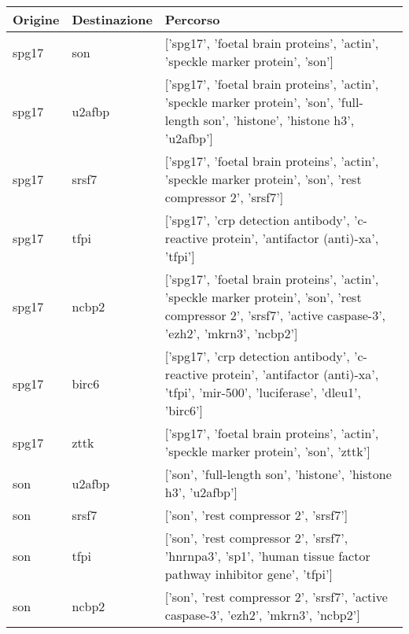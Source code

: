 \documentclass[12pt]{report}
\begin{document}
\begin{table}[!htb]
    \begin{tabularx}{\textwidth}{|l|l|X|}
            \hline
            \textbf{Origine} & \textbf{Destinazione} & \textbf{Percorso}  \\
            \hline
            \scriptsize{spg17} & \scriptsize{son} & \scriptsize{ ['spg17', 'foetal brain proteins', 'actin', 'speckle marker protein', 'son'] } \\ \hline
        \scriptsize{spg17} & \scriptsize{u2afbp} & \scriptsize{ ['spg17', 'foetal brain proteins', 'actin', 'speckle marker protein', 'son', 'full-length son', 'histone', 'histone h3', 'u2afbp'] } \\ \hline
        \scriptsize{spg17} & \scriptsize{srsf7} & \scriptsize{ ['spg17', 'foetal brain proteins', 'actin', 'speckle marker protein', 'son', 'rest compressor 2', 'srsf7'] } \\ \hline
        \scriptsize{spg17} & \scriptsize{tfpi} & \scriptsize{ ['spg17', 'crp detection antibody', 'c-reactive protein', 'antifactor (anti)-xa', 'tfpi'] } \\ \hline
        \scriptsize{spg17} & \scriptsize{ncbp2} & \scriptsize{ ['spg17', 'foetal brain proteins', 'actin', 'speckle marker protein', 'son', 'rest compressor 2', 'srsf7', 'active caspase-3', 'ezh2', 'mkrn3', 'ncbp2'] } \\ \hline
        \scriptsize{spg17} & \scriptsize{birc6} & \scriptsize{ ['spg17', 'crp detection antibody', 'c-reactive protein', 'antifactor (anti)-xa', 'tfpi', 'mir-500', 'luciferase', 'dleu1', 'birc6'] } \\ \hline
        \scriptsize{spg17} & \scriptsize{zttk} & \scriptsize{ ['spg17', 'foetal brain proteins', 'actin', 'speckle marker protein', 'son', 'zttk'] } \\ \hline
        \scriptsize{son} & \scriptsize{u2afbp} & \scriptsize{ ['son', 'full-length son', 'histone', 'histone h3', 'u2afbp'] } \\ \hline
        \scriptsize{son} & \scriptsize{srsf7} & \scriptsize{ ['son', 'rest compressor 2', 'srsf7'] } \\ \hline
        \scriptsize{son} & \scriptsize{tfpi} & \scriptsize{ ['son', 'rest compressor 2', 'srsf7', 'hnrnpa3', 'sp1', 'human tissue factor pathway inhibitor gene', 'tfpi'] } \\ \hline
        \scriptsize{son} & \scriptsize{ncbp2} & \scriptsize{ ['son', 'rest compressor 2', 'srsf7', 'active caspase-3', 'ezh2', 'mkrn3', 'ncbp2'] } \\ \hline

\end{tabularx}
\end{table}
\end{document}
